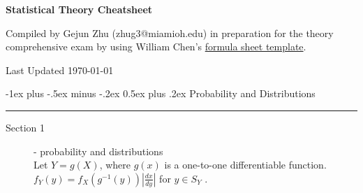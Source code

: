 \documentclass[10pt,landscape]{article}
\makeatletter
\renewcommand{\section}{\@startsection{section}{1}{0mm}%
                                {-1ex plus -.5ex minus -.2ex}%
                                {0.5ex plus .2ex}%
                                {\normalfont\normalsize\bfseries}}
\makeatother
\begin{document}
\raggedright
\footnotesize
\begin{multicols}{3}


\setlength{\premulticols}{1pt}
\setlength{\postmulticols}{1pt}
\setlength{\multicolsep}{1pt}
\setlength{\columnsep}{2pt}


\begin{center}
     \Large{\textbf{Statistical Theory Cheatsheet}} \\
\end{center}


\scriptsize

Compiled by Gejun Zhu (zhug3@miamioh.edu) in preparation for the theory comprehensive exam by using William Chen's \href{http://wzchen.com/probability-cheatsheet}{formula sheet template}. 

\begin{center}
    Last Updated \today
\end{center}




%

\section{Probability and Distributions} \smallskip \hrule height 1pt \smallskip
\begin{description}
	\item[Section 1] - probability and distributions \\
	Let $Y=g(X)$, where $g(x)$ is a one-to-one differentiable function. $f_Y(y) = f_X(g^{-1}(y)) |\frac{dx}{dy}|$ for $y \in S_Y$ . \\



\end{description}
\end{multicols}
\end{document}
